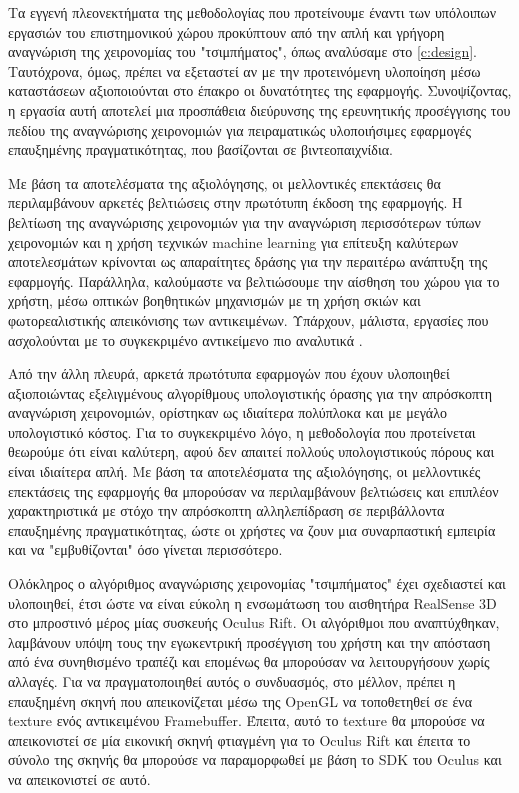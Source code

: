 

Τα εγγενή πλεονεκτήματα της μεθοδολογίας που προτείνουμε έναντι των υπόλοιπων εργασιών του επιστημονικού χώρου προκύπτουν από την απλή και γρήγορη αναγνώριση της χειρονομίας του "τσιμπήματος", όπως αναλύσαμε στο \ref{c:design}. Ταυτόχρονα, όμως, πρέπει να εξεταστεί αν με την προτεινόμενη υλοποίηση μέσω καταστάσεων αξιοποιούνται στο έπακρο οι δυνατότητες της εφαρμογής. Συνοψίζοντας, η εργασία αυτή αποτελεί μια προσπάθεια διεύρυνσης της ερευνητικής προσέγγισης του πεδίου της αναγνώρισης χειρονομιών για πειραματικώς υλοποιήσιμες εφαρμογές επαυξημένης πραγματικότητας, που βασίζονται σε βιντεοπαιχνίδια.



Με βάση τα αποτελέσματα της αξιολόγησης, οι μελλοντικές επεκτάσεις θα περιλαμβάνουν αρκετές βελτιώσεις στην πρωτότυπη έκδοση της εφαρμογής. Η βελτίωση της αναγνώρισης χειρονομιών για την αναγνώριση περισσότερων τύπων χειρονομιών και η χρήση τεχνικών machine learning για επίτευξη καλύτερων αποτελεσμάτων κρίνονται ως απαραίτητες δράσης για την περαιτέρω ανάπτυξη της εφαρμογής. Παράλληλα, καλούμαστε να βελτιώσουμε την αίσθηση του χώρου για το χρήστη, μέσω οπτικών βοηθητικών μηχανισμών με τη χρήση σκιών και φωτορεαλιστικής απεικόνισης των αντικειμένων. Υπάρχουν, μάλιστα, εργασίες που ασχολούνται με το συγκεκριμένο αντικείμενο πιο αναλυτικά \cite{Kruijff2010} \cite{Ha2014} \cite{Prachyabrued2014}.



Από την άλλη πλευρά, αρκετά πρωτότυπα εφαρμογών που έχουν υλοποιηθεί αξιοποιώντας εξελιγμένους αλγορίθμους υπολογιστικής όρασης για την απρόσκοπτη αναγνώριση χειρονομιών, ορίστηκαν ως ιδιαίτερα πολύπλοκα και με μεγάλο υπολογιστικό κόστος. Για το συγκεκριμένο λόγο, η μεθοδολογία που προτείνεται θεωρούμε ότι είναι καλύτερη, αφού δεν απαιτεί πολλούς υπολογιστικούς πόρους και είναι ιδιαίτερα απλή. Με βάση τα αποτελέσματα της αξιολόγησης, οι μελλοντικές επεκτάσεις της εφαρμογής θα μπορούσαν να περιλαμβάνουν βελτιώσεις και επιπλέον χαρακτηριστικά με στόχο την απρόσκοπτη αλληλεπίδραση σε περιβάλλοντα επαυξημένης πραγματικότητας, ώστε οι χρήστες να ζουν μια συναρπαστική εμπειρία και να "εμβυθίζονται" όσο γίνεται περισσότερο. 




Ολόκληρος ο αλγόριθμος αναγνώρισης χειρονομίας "τσιμπήματος" έχει σχεδιαστεί και υλοποιηθεί, έτσι ώστε να είναι εύκολη η ενσωμάτωση του αισθητήρα RealSense 3D στο μπροστινό μέρος μίας συσκευής Oculus Rift. Οι αλγόριθμοι που αναπτύχθηκαν, λαμβάνουν υπόψη τους την εγωκεντρική προσέγγιση του χρήστη και την απόσταση από ένα συνηθισμένο τραπέζι και επομένως θα μπορούσαν να λειτουργήσουν χωρίς αλλαγές. Για να πραγματοποιηθεί αυτός ο συνδυασμός, στο μέλλον, πρέπει η επαυξημένη σκηνή που απεικονίζεται μέσω της OpenGL να τοποθετηθεί σε ένα texture ενός αντικειμένου Framebuffer. Έπειτα, αυτό το texture θα μπορούσε να απεικονιστεί σε μία εικονική σκηνή φτιαγμένη για το Oculus Rift και έπειτα το σύνολο της σκηνής θα μπορούσε να παραμορφωθεί με βάση το SDK του Oculus και να απεικονιστεί σε αυτό. 


